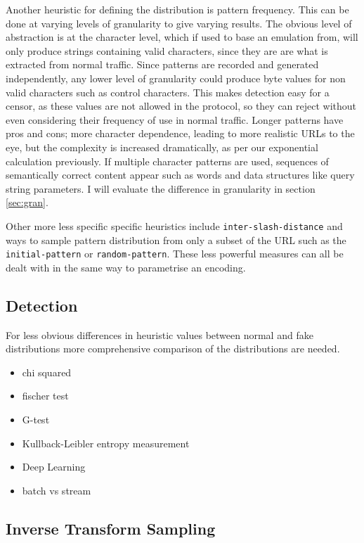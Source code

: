 \documentclass[ %
                    author={Samuel Russell},
                supervisor={Prof. Bogdan Warinschi},
                    degree={MEng},
                     title={Innocuous Ciphertexts},
                  subtitle={The DE-CENSOR Scheme},
                      type={research},
                      year={2018} ]{dissertation}
\begin{document}
Another heuristic for defining the distribution is pattern frequency.
This can be done at varying levels of granularity to give varying results.
The obvious level of abstraction is at the character level, which if used to base an emulation from, will only produce strings containing valid characters, since they are are what is extracted from normal traffic.
Since patterns are recorded and generated independently, any lower level of granularity could produce byte values for non valid characters such as control characters.
This makes detection easy for a censor, as these values are not allowed in the protocol, so they can reject without even considering their frequency of use in normal traffic.
Longer patterns have pros and cons; more character dependence, leading to more realistic URLs to the eye, but the complexity is increased dramatically, as per our exponential calculation previously.
If multiple character patterns are used, sequences of semantically correct content appear such as words and data structures like query string parameters.
I will evaluate the difference in granularity in section \ref{sec:gran}.

Other more less specific specific heuristics include \texttt{inter-slash-distance} and ways to sample pattern distribution from only a subset of the URL such as the \texttt{initial-pattern} or \texttt{random-pattern}. These less powerful measures can all be dealt with in the same way to parametrise an encoding.

\subsection{Detection}

For less obvious differences in heuristic values between normal and fake distributions more comprehensive comparison of the distributions are needed.

\begin{itemize}
\item chi squared 
\item fischer test
\item G-test
\item Kullback-Leibler entropy measurement
\item Deep Learning
\item batch vs stream
\end{itemize}

\subsection{Inverse Transform Sampling}
\end{document}
